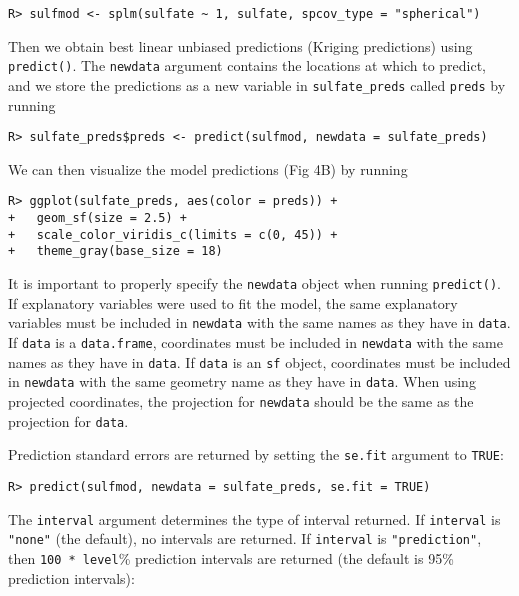 \documentclass[10pt,letterpaper]{article}
\begin{document}
\begin{verbatim}
R> sulfmod <- splm(sulfate ~ 1, sulfate, spcov_type = "spherical")
\end{verbatim}

Then we obtain best linear unbiased predictions (Kriging predictions)
using \texttt{predict()}. The \texttt{newdata} argument contains the
locations at which to predict, and we store the predictions as a new
variable in \texttt{sulfate\_preds} called \texttt{preds} by running

\begin{verbatim}
R> sulfate_preds$preds <- predict(sulfmod, newdata = sulfate_preds)
\end{verbatim}

We can then visualize the model predictions (Fig 4B) by running

\begin{verbatim}
R> ggplot(sulfate_preds, aes(color = preds)) +
+   geom_sf(size = 2.5) +
+   scale_color_viridis_c(limits = c(0, 45)) +
+   theme_gray(base_size = 18)
\end{verbatim}

It is important to properly specify the \texttt{newdata} object when
running \texttt{predict()}. If explanatory variables were used to fit
the model, the same explanatory variables must be included in
\texttt{newdata} with the same names as they have in \texttt{data}. If
\texttt{data} is a \texttt{data.frame}, coordinates must be included in
\texttt{newdata} with the same names as they have in \texttt{data}. If
\texttt{data} is an \texttt{sf} object, coordinates must be included in
\texttt{newdata} with the same geometry name as they have in
\texttt{data}. When using projected coordinates, the projection for
\texttt{newdata} should be the same as the projection for \texttt{data}.

Prediction standard errors are returned by setting the \texttt{se.fit}
argument to \texttt{TRUE}:

\begin{verbatim}
R> predict(sulfmod, newdata = sulfate_preds, se.fit = TRUE)
\end{verbatim}

The \texttt{interval} argument determines the type of interval returned.
If \texttt{interval} is \texttt{"none"} (the default), no intervals are
returned. If \texttt{interval} is \texttt{"prediction"}, then
\texttt{100\ *\ level}\% prediction intervals are returned (the default
is 95\% prediction intervals):
\end{document}
